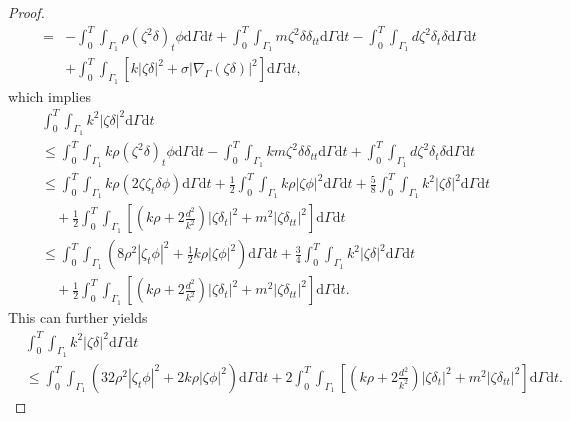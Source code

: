 \documentclass[10pt]{elsarticle}
\begin{document}
\begin{proof}
\begin{equation*}
\begin{split}
=& -\int_{0}^{T}\int_{\Gamma_1}\rho(\zeta^2\delta)_t\phi \mathrm{d}\Gamma \mathrm{d}t  + \int_{0}^{T}\int_{\Gamma_1}m\zeta^2\delta\delta_{tt} \mathrm{d}\Gamma \mathrm{d}t - \int_{0}^{T}\int_{\Gamma_1}d\zeta^2\delta_t\delta \mathrm{d}\Gamma \mathrm{d}t\\
&+\int_{0}^{T}\int_{\Gamma_1}\left[k |\zeta\delta|^2 + \sigma|\nabla_{\Gamma} (\zeta\delta)|^2\right]\mathrm{d}\Gamma \mathrm{d}t,
\end{split}
\end{equation*}
which implies
\begin{equation*}
\begin{split}
&\int_{0}^{T}\int_{\Gamma_1}k^2 |\zeta\delta|^2 \mathrm{d}\Gamma \mathrm{d}t\\
&\leqslant \int_{0}^{T}\int_{\Gamma_1}k\rho(\zeta^2\delta)_t\phi \mathrm{d}\Gamma \mathrm{d}t  - \int_{0}^{T}\int_{\Gamma_1}km\zeta^2\delta\delta_{tt} \mathrm{d}\Gamma \mathrm{d}t + \int_{0}^{T}\int_{\Gamma_1}d\zeta^2\delta_t\delta \mathrm{d}\Gamma \mathrm{d}t\\
&\leqslant \int_{0}^{T}\int_{\Gamma_1}k\rho(2\zeta\zeta_t\delta\phi) \mathrm{d}\Gamma \mathrm{d}t +\frac{1}{2}\int_{0}^{T}\int_{\Gamma_1}k\rho|\zeta\phi|^2  \mathrm{d}\Gamma \mathrm{d}t  +\frac{5}{8} \int_{0}^{T}\int_{\Gamma_1}k^2|\zeta\delta|^2 \mathrm{d}\Gamma \mathrm{d}t \\
&\quad +\frac{1}{2}\int_{0}^{T}\int_{\Gamma_1}\left[\left(k\rho + 2\frac{d^2}{k^2}\right) |\zeta\delta_t|^2 + m^2|\zeta\delta_{tt}|^2\right]\mathrm{d}\Gamma \mathrm{d}t\\
&\leqslant \int_{0}^{T}\int_{\Gamma_1}\left(8\rho^2|\zeta_t\phi|^2 +\frac{1}{2} k\rho|\zeta\phi|^2  \right)\mathrm{d}\Gamma \mathrm{d}t  +\frac{3}{4} \int_{0}^{T}\int_{\Gamma_1}k^2|\zeta\delta|^2 \mathrm{d}\Gamma \mathrm{d}t
\\
&\quad +\frac{1}{2}\int_{0}^{T}\int_{\Gamma_1}\left[\left(k\rho + 2\frac{d^2}{k^2}\right) |\zeta\delta_t|^2 + m^2|\zeta\delta_{tt}|^2\right]\mathrm{d}\Gamma \mathrm{d}t.
\end{split}
\end{equation*}
This can further yields
\begin{equation} \label{ob11_2}
\begin{split}
&\int_{0}^{T}\int_{\Gamma_1}k^2 |\zeta\delta|^2 \mathrm{d}\Gamma \mathrm{d}t\\
&\leqslant \int_{0}^{T}\int_{\Gamma_1}\left(32\rho^2|\zeta_t\phi|^2 + 2k\rho|\zeta\phi|^2\right) \mathrm{d}\Gamma \mathrm{d}t + 2\int_{0}^{T}\int_{\Gamma_1}\left[\left(k\rho + 2\frac{d^2}{k^2}\right) |\zeta\delta_t|^2 + m^2|\zeta\delta_{tt}|^2\right]\mathrm{d}\Gamma \mathrm{d}t .

\end{split}
\end{equation}
\end{proof}
\end{document}
